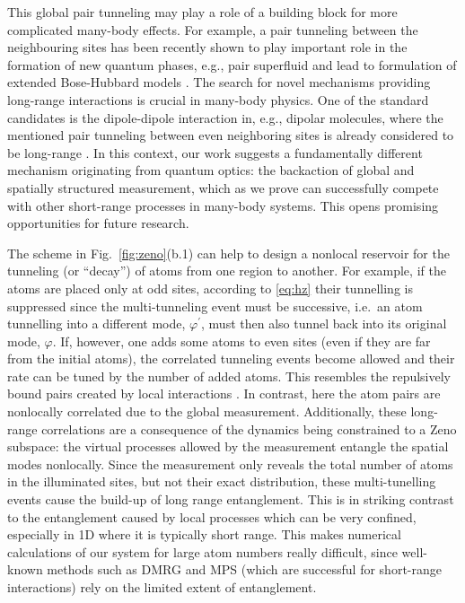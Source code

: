 This global pair tunneling may play a role of a building block for
more complicated many-body effects. For example, a pair tunneling
between the neighbouring sites has been recently shown to play
important role in the formation of new quantum phases, e.g., pair
superfluid \cite{sowinski2012} and lead to formulation of extended
Bose-Hubbard models \cite{omjyoti2015}. The search for novel
mechanisms providing long-range interactions is crucial in many-body
physics. One of the standard candidates is the dipole-dipole
interaction in, e.g., dipolar molecules, where the mentioned pair
tunneling between even neighboring sites is already considered to be
long-range \cite{sowinski2012,omjyoti2015}. In this context, our work
suggests a fundamentally different mechanism originating from quantum
optics: the backaction of global and spatially structured measurement,
which as we prove can successfully compete with other short-range
processes in many-body systems. This opens promising opportunities for
future research.

The scheme in Fig.~\ref{fig:zeno}(b.1) can help to design a nonlocal
reservoir for the tunneling (or ``decay'') of atoms from one region to
another. For example, if the atoms are placed only at odd sites,
according to \eqref{eq:hz} their tunnelling is suppressed since the
multi-tunneling event must be successive, i.e.~an atom tunnelling into
a different mode, $\varphi^\prime$, must then also tunnel back into
its original mode, $\varphi$. If, however, one adds some atoms to even
sites (even if they are far from the initial atoms), the correlated
tunneling events become allowed and their rate can be tuned by the
number of added atoms. This resembles the repulsively bound pairs
created by local interactions \cite{winkler2006, folling2007}. In
contrast, here the atom pairs are nonlocally correlated due to the
global measurement. Additionally, these long-range correlations are a
consequence of the dynamics being constrained to a Zeno subspace: the
virtual processes allowed by the measurement entangle the spatial
modes nonlocally. Since the measurement only reveals the total number
of atoms in the illuminated sites, but not their exact distribution,
these multi-tunelling events cause the build-up of long range
entanglement. This is in striking contrast to the entanglement caused
by local processes which can be very confined, especially in 1D where
it is typically short range. This makes numerical calculations of our
system for large atom numbers really difficult, since well-known
methods such as DMRG and MPS \cite{schollwock2005} (which are successful
for short-range interactions) rely on the limited extent of
entanglement.

